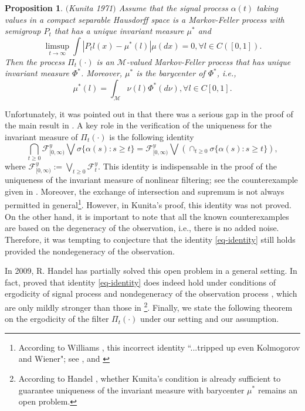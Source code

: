\documentclass[12pt]{amsart}
\newtheorem{pron}{Proposition}[section]
\theoremstyle{remark}
\numberwithin{equation}{section}
\newcommand{\M}{\mathcal{M}}
\newcommand{\F}{\mathcal{F}}
\numberwithin{equation}{section}
\newcommand{\1}{\boldsymbol{1}}
\begin{document}
\begin{pron}
$($Kunita 1971$)$
	Assume that the signal process $\alpha(t)$ taking values in a compact separable Hausdorff space is a Markov-Feller process with semigroup $P_t$ that has a unique invariant measure $\mu^*$ and
	$$
	\limsup_{t\to\infty}\int|P_tl(x)-\mu^*(l)|\mu(dx)=0,\forall l\in C([0,1]).
	$$
	Then the process $\Pi_t(\cdot)$ is an $\M$-valued Markov-Feller process that has unique invariant measure $\Phi^*$. Moreover, $\mu^*$ is the barycenter of $\Phi^*$, i.e.,
	$$
	\mu^*(l)=\int_{\M} \nu(l)\Phi^*(d\nu), \forall l\in C[0,1].
	$$
\end{pron}

Unfortunately, it was pointed out in \cite{BCL04} that there was a serious gap in the proof of the main result in \cite{Kun71}. A key role in the verification of the uniqueness for the invariant measure of $\Pi_t(\cdot)$ is the following identity
\begin{equation}\label{eq-identity}
\bigcap_{t\geq 0}\F_{[0,\infty)}^y\bigvee \sigma\{\alpha(s):s\geq t\}=\F_{[0,\infty)}^y\bigvee \left(\cap_{t\geq 0}\sigma\{\alpha(s):s\geq t\}\right),
\end{equation}
where $\F_{[0,\infty)}^y:=\bigvee_{t\geq 0}\F_t^y$.
This identity is indispensable in the proof of the uniqueness of the invariant measure of nonlinear filtering; see the counterexample given in \cite{BCL04}.
Moreover, the exchange of intersection and supremum is not always permitted in general\footnote{According to Williams \cite{Wil91}, this incorrect identity ``...tripped up even Kolmogorov and Wiener"; see \cite[p. 837]{Sin89}, and \cite[pp. 91--93]{Mas66}}.
However, in Kunita's proof, this identity was not proved.
On the other hand, it is important to note that all the known counterexamples are based on the degeneracy of the observation, i.e., there is no added noise.
Therefore, it was tempting to conjecture that the identity  \eqref{eq-identity} still holds provided the nondegeneracy of the observation.

In 2009, R. Handel \cite{Han09}  has
partially solved this open problem
 in a general setting.
In fact, \cite[Theorem 4.2]{Han09} proved that  identity \eqref{eq-identity} does indeed
hold under conditions of ergodicity of signal process \cite[Assumption 3.1]{Han09} and nondegeneracy of the observation process \cite[Assumption 3.2]{Han09}, which are only mildly stronger than those in \cite{Kun71}\footnote{According to Handel \cite{Han09}, whether Kunita's condition is already sufficient to guarantee uniqueness of the
	invariant measure with barycenter $\mu^*$ remains an open problem.}.
Finally, we state the following theorem on the ergodicity of the filter $\Pi_t(\cdot)$ under our setting and our assumption.
\end{document}
